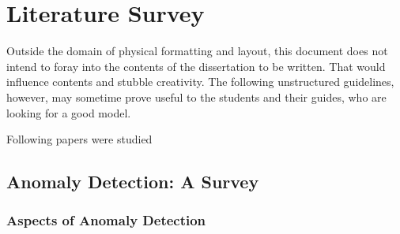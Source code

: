 \chapter{Literature Survey}\label{Unstructured}
Outside the domain of physical formatting and layout, this document does not intend to foray into the contents of the dissertation to be written. That would influence contents and stubble creativity. The following unstructured guidelines, however, may sometime prove useful to the students and their guides, who are looking for a good model.

\par 
Following papers were studied

\section{Anomaly Detection: A Survey}

\subsection{Aspects of Anomaly Detection}

